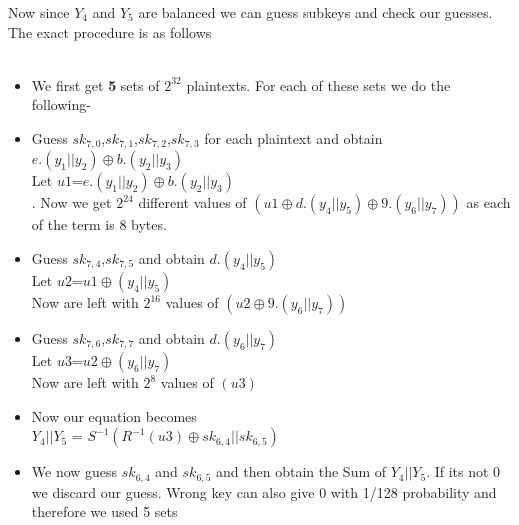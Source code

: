 \documentclass[preprint]{transcrypto}
\begin{document}
Now since $Y_{4}$ and $Y_{5}$ are balanced we can guess subkeys and check our guesses. \\ The exact procedure is as follows \\ \\
\begin{itemize}
	\item We first get \textbf{5} sets of $2^{32}$ plaintexts. For each of these sets we do the following-
	\item Guess $sk_{7,0}$,$sk_{7,1}$,$sk_{7,2}$,$sk_{7,3}$ for each plaintext and obtain $e.(y_{1}||y_{2})\oplus b.(y_{2}||y_{3})$\\
	Let $u1$=$e.(y_{1}||y_{2})\oplus b.(y_{2}||y_{3})$ \\.
	Now we get $2^{24}$ different values of $(u1\oplus d.(y_{4}||y_{5})\oplus9.(y_{6}|| y_{7}))$ as each of the term is 8 bytes.
	
	\item Guess $sk_{7,4}$,$sk_{7,5}$ and obtain 
	$d.(y_{4}||y_{5})$\\
	Let $u2$=$u1 \oplus (y_{4}||y_{5})$  \\  
	Now are left with $2^{16}$ values of $(u2\oplus9.(y_{6}|| y_{7}))$ \\
	\item Guess $sk_{7,6}$,$sk_{7,7}$ and obtain 
	$d.(y_{6}||y_{7})$\\
	Let $u3$=$u2 \oplus (y_{6}||y_{7})$  \\  
	Now are left with $2^8$ values of $(u3)$ \\
	 \item Now our equation becomes \\
	 $Y_{4}||Y_{5}$ = $S^{-1}(R^{-1}(u3)
	 \oplus sk_{6,4} || sk_{6,5})$\\
	 \item We now guess $sk_{6,4}$ and $sk_{6,5}$ and then obtain the Sum of $Y_{4}||Y_{5}$. If its not 0 we discard our guess. Wrong key can also give 0  with 1/128 probability and therefore we used 5 sets
\end{itemize}

\printbibliography

\end{document}
